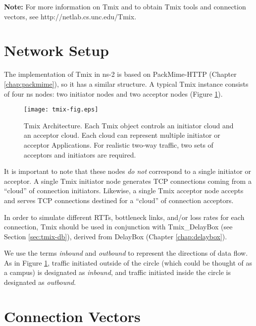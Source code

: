 \textbf{Note:} For more information on Tmix and to obtain Tmix tools and connection vectors, see http://netlab.cs.unc.edu/Tmix.

\section{Network Setup}

The implementation of Tmix in ns-2 is based on PackMime-HTTP (Chapter
\ref{chap:packmime}), so it has a similar structure.  A typical
Tmix instance consists of four ns nodes: two initiator nodes and two
acceptor nodes (Figure \ref{fig:tmix}).  
\begin{figure}
\centering
\texttt{[image: tmix-fig.eps]}
\label{fig:tmix}
\caption{Tmix Architecture. Each Tmix object controls
an initiator cloud and an acceptor cloud.  Each cloud can represent
multiple initiator or acceptor Applications.  For realistic two-way
traffic, two sets of acceptors and initiators are required.}
\end{figure}  
It is important to note that these nodes \emph{do not} correspond to a
single initiator or acceptor. A single Tmix initiator node generates
TCP connections coming from a ``cloud'' of connection initiators.
Likewise, a single Tmix acceptor node accepts and serves TCP
connections destined for a ``cloud'' of connection acceptors. 

In order to simulate different RTTs, bottleneck links, and/or loss
rates for each connection, Tmix should be used in conjunction with
Tmix\_DelayBox (see Section \ref{sec:tmix-db}), derived from
DelayBox (Chapter \ref{chap:delaybox}).  

We use the terms \emph{inbound} and \emph{outbound} to represent the
directions of data flow.  As in Figure \ref{fig:tmix}, traffic
initiated outside of the circle (which could be thought of as a
campus) is designated as \emph{inbound}, and traffic initiated inside
the circle is designated as \emph{outbound}.

\section{Connection Vectors}


